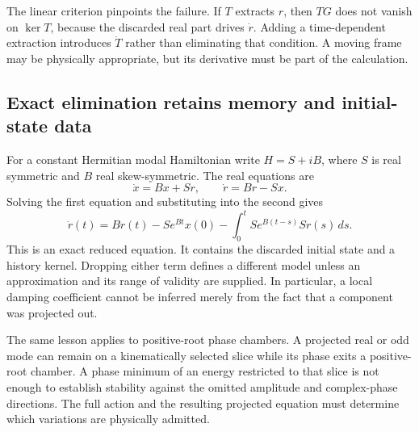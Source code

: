 \documentclass[11pt,a4paper]{article}
\begin{document}
The linear criterion pinpoints the failure. If $T$ extracts $r$,
then $TG$ does not vanish on $\ker T$, because the discarded real
part drives $\dot r$. Adding a time-dependent extraction introduces
$\dot T$ rather than eliminating that condition. A moving frame may
be physically appropriate, but its derivative must be part of the
calculation.

\subsection{Exact elimination retains memory and initial-state data}
For a constant Hermitian modal Hamiltonian write
$H=S+iB$, where $S$ is real symmetric and $B$ real skew-symmetric.
The real equations are
\begin{equation}
 \dot x=Bx+Sr,\qquad\dot r=Br-Sx.
\end{equation}
Solving the first equation and substituting into the second gives
\begin{equation}
 \dot r(t)=Br(t)-Se^{Bt}x(0)
       -\int_0^tSe^{B(t-s)}Sr(s)\,ds.
\end{equation}
This is an exact reduced equation. It contains the discarded initial
state and a history kernel. Dropping either term defines a different
model unless an approximation and its range of validity are supplied.
In particular, a local damping coefficient cannot be inferred merely
from the fact that a component was projected out.

The same lesson applies to positive-root phase chambers. A projected
real or odd mode can remain on a kinematically selected slice while
its phase exits a positive-root chamber. A phase minimum of an energy
restricted to that slice is not enough to establish stability against
the omitted amplitude and complex-phase directions. The full action
and the resulting projected equation must determine which variations
are physically admitted.
\end{document}
